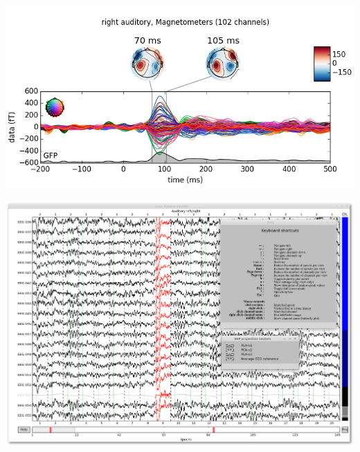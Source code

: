\documentclass[t,11pt,compress]{beamer} %
\newcommand{\vfillll}{\vfilll\vfilll\vfilll\vfilll\vfilll\vfilll\vfilll\vfilll\vfilll\vfilll\vfilll\vfilll\vfilll\vfilll\vfilll\vfilll\vfilll\vfilll\vfilll\vfilll\vfilll\vfilll\vfilll\vfilll\vfilll\vfilll\vfilll\vfilll\vfilll\vfilll\vfilll\vfilll\vfilll\vfilll\vfilll\vfilll\vfilll\vfilll\vfilll\vfilll}
\begin{document}
\begin{frame}[plain,t,c]
\vfillll


\vfillll

\vspace*{-2.2em}%


\begin{minipage}{1.09\linewidth}

\hspace{-0.1em}%
\begin{minipage}{.25\linewidth}
    \includegraphics[width=\linewidth]{img/joint_plot.png}
\end{minipage}%
\begin{minipage}{.225\linewidth}
    \includegraphics[width=0.85\linewidth]{img/epochs_plotter.png}%
\end{minipage}%
\hspace{-2.0em}%
\hspace{-.4em}%

\end{minipage}
\end{frame}
\end{document}
